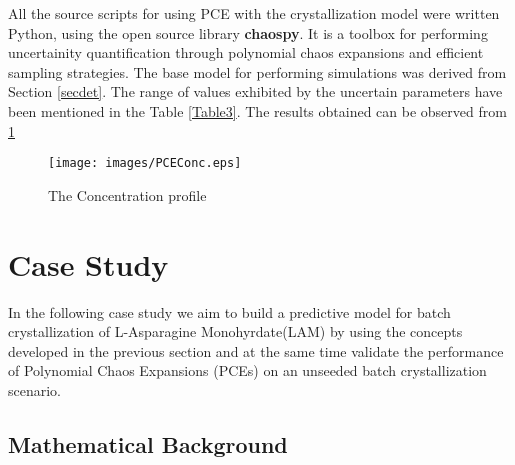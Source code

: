 \documentclass[3p,times,authoryear]{elsarticle}
\begin{document}
All the source scripts for using PCE with the crystallization model were written Python, using the open source library \textbf{chaospy}\cite{chaospy}. It is a toolbox for performing uncertainity quantification through polynomial chaos expansions and efficient sampling strategies. The base model for performing simulations was derived from Section \ref{secdet}. The range of values exhibited by the uncertain parameters have been mentioned in the Table \ref{Table3}. The results obtained can be observed from \cref{PCEConc}






\begin{figure}[h!] 

\begin{center}
\texttt{[image: images/PCEConc.eps]} \label{PCEConc}
\end{center}
\caption{The Concentration profile}
\end{figure}

\section{Case Study}

In the following case study we aim to build a predictive model for batch crystallization of L-Asparagine Monohyrdate(LAM) by using the concepts developed in the previous section and at the same time validate the performance of Polynomial Chaos Expansions (PCEs) on an unseeded batch crystallization scenario.   

\subsection{Mathematical Background}
\end{document}
